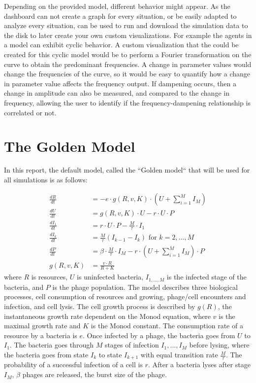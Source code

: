 Depending on the provided model, different behavior might appear. 
As the dashboard can not create a graph for every situation, or be easily adapted to analyze every situation,  can be used to run and download the simulation data to the disk to later create your own custom visualizations. 
For example the agents in a model can exhibit cyclic behavior. 
A custom visualization that the could be created for this cyclic model would be to perform a Fourier transformation on the curve to obtain the predominant frequencies. 
A change in parameter values would change the frequencies of the curve, so it would be easy to quantify how a change in parameter value affects the frequency output. 
If dampening occurs, then a change in amplitude can also be measured, and compared to the change in frequency, allowing the user to identify if the frequency-dampening relationship is correlated or not. 

\section{The Golden Model}
\label{sec:golden_model}
In this report, the default model, called the “Golden model“ \cite{gengUsingBacterialPopulation2024} that will be used for all simulations is as follows:

\begin{align}
    \frac{dR}{dt} &= -e \cdot g(R, v, K)\cdot (U + \sum_{i=1}^{M} I_M)\\
    \frac{dU}{dt} &= g(R, v, K)\cdot U - r\cdot U \cdot P\\
    \frac{dI_1}{dt} &= r\cdot U \cdot P - \frac{M}{\tau}\cdot I_1 \\
    \frac{dI_k}{dt} &= \frac{M}{\tau}(I_{k-1}-I_k) \text{ for } k=2, \dots, M \\
    \frac{dP}{dt} &= \beta \cdot\frac{M}{\tau} \cdot I_M - r\cdot(U + \sum_{i=1}^{M} I_M)\cdot P \\
    g(R, v, K) &= \frac{v\cdot R}{R + K}
\end{align} where $R$ is resources, $U$ is uninfected bacteria, $I_{1, \dots, M}$ is the infected stage of the bacteria, and $P$ is the phage population. \newline
The model describes three biological processes, cell consumption of resources and growing, phage/cell encounters and infection, and cell lysis. 
The cell growth process is described by $g(R)$, the instantaneous growth rate dependent on the Monod equation, where $v$ is the maximal growth rate and $K$ is the Monod constant. 
The consumption rate of a resource by a bacteria is $e$. \newline
Once infected by a phage, the bacteria goes from $U$ to $I_1$. 
The bacteria goes through $M$ stages of infection $I_1, \dots, I_M$ before lysing, where the bacteria goes from state $I_k$ to state $I_{k+1}$ with equal transition rate $\frac{M}{\tau}$. The probability of a successful infection of a cell is $r$. \newline
After a bacteria lyses after stage $I_M$, $\beta$ phages are released, the burst size of the phage. 

